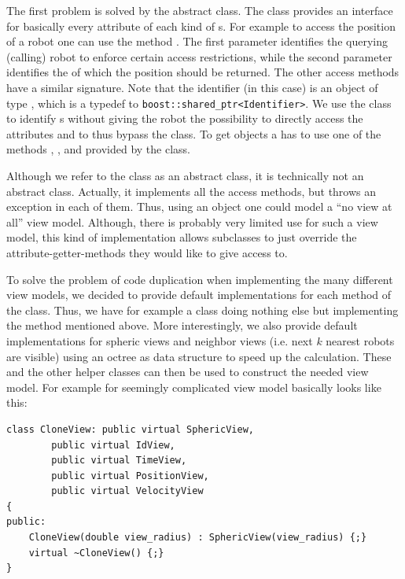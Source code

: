 The first problem is solved by the abstract  class. The class provides an interface for basically every attribute of each kind of s. For example to access the position of a robot one can use the  method . The first parameter identifies the querying (calling) robot to enforce certain access restrictions, while the second parameter identifies the  of which the position should be returned. The other access methods have a similar signature. Note that the identifier (in this case) is an object of type , which is a typedef to \texttt{boost::shared\_ptr<Identifier>}. We use the  class to identify s without giving the robot the possibility to directly access the attributes and to thus bypass the  class. To get  objects a  has to use one of the methods , , and  provided by the  class. 


Although we refer to the  class as an abstract class, it is technically not an abstract class. Actually, it implements all the access methods, but throws an  exception in each of them. Thus, using an  object one could model a ``no view at all'' view model. Although, there is probably very limited use for such a view model, this kind of implementation allows subclasses to just override the attribute-getter-methods they would like to give access to. 


To solve the problem of code duplication when implementing the many different view models, we decided to provide default implementations for each method of the  class. Thus, we have for example a  class doing nothing else but implementing the  method mentioned above. More interestingly, we also provide default implementations for spheric views and neighbor views (i.e. next $k$ nearest robots are visible) using an octree as data structure to speed up the calculation. These and the other helper classes can then be used to construct the needed view model. For example for seemingly complicated view model  basically looks like this:

\begin{lstlisting}
class CloneView: public virtual SphericView,
		public virtual IdView,
		public virtual TimeView,
		public virtual PositionView,
		public virtual VelocityView 
{
public:
	CloneView(double view_radius) : SphericView(view_radius) {;}
	virtual ~CloneView() {;}		
}
\end{lstlisting}

